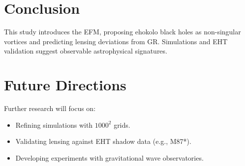 \documentclass{article}
\begin{document}
\section{Conclusion}
This study introduces the EFM, proposing ehokolo black holes as non-singular vortices and predicting lensing deviations from GR. Simulations and EHT validation suggest observable astrophysical signatures.

\section{Future Directions}
Further research will focus on:
\begin{itemize}
    \item Refining simulations with \(1000^2\) grids.
    \item Validating lensing against EHT shadow data (e.g., M87*).
    \item Developing experiments with gravitational wave observatories.
\end{itemize}
\end{document}
